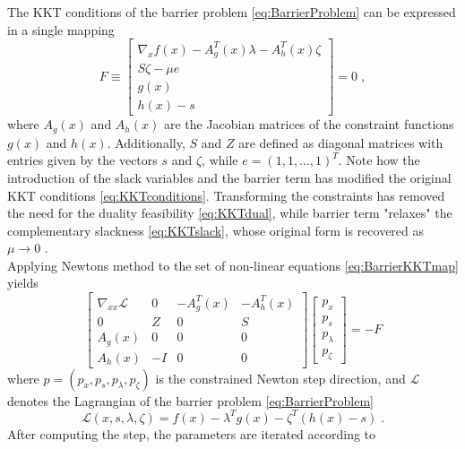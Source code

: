 The KKT conditions of the barrier problem \eqref{eq:BarrierProblem} can be expressed in a single mapping 
\begin{equation}
	F \equiv 
	\begin{bmatrix}
  \nabla_x f(x) - A_{g}^{T}(x) \lambda  - A_{h}^{T}(x) \zeta \\
  S \zeta - \mu e \\
  g(x)		\\
  h(x) - s 
  \end{bmatrix}
  = 0 \; ,
  \label{eq:BarrierKKTmap}
\end{equation}
where $A_g (x)$ and $A_h (x)$ are the Jacobian matrices of the constraint functions $g(x)$ and $h(x)$. Additionally, $S$ and $Z$ are defined as diagonal matrices with entries given by the vectors $s$ and $\zeta$, while $e = (1 ,1 , \ldots , 1 )^T$. Note how the introduction of the slack variables and the barrier term has modified the original KKT conditions \eqref{eq:KKTconditions}. Transforming the constraints has removed the need for the duality feasibility \eqref{eq:KKTdual}, while barrier term "relaxes" the complementary slackness \eqref{eq:KKTslack}, whose original form is recovered as $\mu \to 0$ \cite{wright}.\\
Applying Newtons method to the set of non-linear equations \eqref{eq:BarrierKKTmap} yields
\begin{equation}
  \begin{bmatrix}
  \nabla_{xx} \mathcal{L} 	& 0 	& -A_{g}^{T}(x)	& -A_{h}^{T}(x)	\\
  0 						& Z 	& 0 			& S 			\\
  A_{g}(x) 					& 0 	& 0 			& 0				\\
  A_{h}(x) 					& -I	& 0				& 0				 
  \end{bmatrix}  
  \begin{bmatrix}
  p_x \\ p_s \\ p_{\lambda} \\ p_{\zeta} 
  \end{bmatrix}
  = - F
  \label{eq:ConNewtonMethod}
\end{equation}
where $p = ( p_x , p_s , p_{\lambda} , p_{\zeta} )$ is the constrained Newton step direction, and $\mathcal{L}$ denotes the Lagrangian of the barrier problem \eqref{eq:BarrierProblem}
\begin{equation}
	\mathcal{L}(x,s,\lambda,\zeta) = f(x) - \lambda^T g(x) - \zeta^T ( h(x) - s)  \; .
\end{equation}
After computing the step, the parameters are iterated according to 
